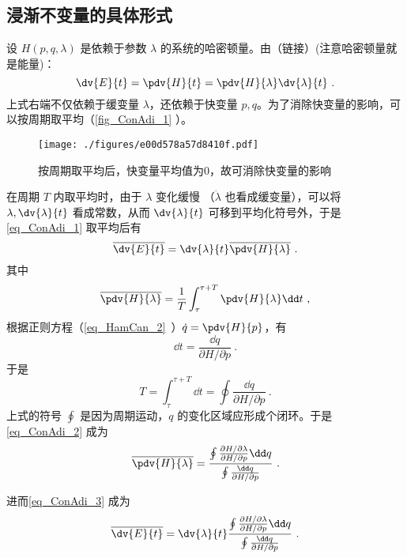 \subsection{浸渐不变量的具体形式}
设 $H(p,q,\lambda)$ 是依赖于参数 $\lambda$ 的系统的哈密顿量。由（链接）(注意哈密顿量就是能量)：
\begin{equation}\label{eq_ConAdi_1}
\dv{E}{t}=\pdv{H}{t}=\pdv{H}{\lambda}\dv{\lambda}{t}~.
\end{equation}
上式右端不仅依赖于缓变量 $\lambda$，还依赖于快变量 $p,q$。为了消除快变量的影响，可以按周期取平均（\autoref{fig_ConAdi_1} ）。
\begin{figure}[ht]
\centering
\texttt{[image: ./figures/e00d578a57d8410f.pdf]}
\caption{按周期取平均后，快变量平均值为0，故可消除快变量的影响} \label{fig_ConAdi_1}
\end{figure}
在周期 $T$ 内取平均时，由于 $\lambda$ 变化缓慢 （$\dot\lambda$ 也看成缓变量），可以将 $\lambda,\dv{\lambda}{t}$ 看成常数，从而 $\dv{\lambda}{t}$ 可移到平均化符号外，于是\autoref{eq_ConAdi_1} 取平均后有
\begin{equation}\label{eq_ConAdi_3}
\overline{\dv{E}{t}}=\dv{\lambda}{t}\overline{\pdv{H}{\lambda}}~.
\end{equation}
其中
\begin{equation}\label{eq_ConAdi_2}
\overline{\pdv{H}{\lambda}}=\frac{1}{T}\int_\tau^{\tau+T}\pdv{H}{\lambda}\dd t~,
\end{equation}
根据正则方程（\autoref{eq_HamCan_2}~）$\dot q=\pdv{H}{p}$，有
\begin{equation}
\dd t=\frac{\dd q}{\partial{H}/\partial{p}}~.
\end{equation}
于是
\begin{equation}
T=\int_{\tau}^{\tau+T}\dd t=\oint\frac{\dd q}{\partial{H}/\partial{p}}~.
\end{equation}
上式的符号 $\oint$ 是因为周期运动，$q$ 的变化区域应形成个闭环。于是\autoref{eq_ConAdi_2} 成为
\begin{equation}
\overline{\pdv{H}{\lambda}}=\frac{\oint\frac{\partial{H}/\partial{\lambda}}{\partial{H}/\partial{p}}\dd q}
{\oint\frac{\dd q}{\partial{H}/\partial{p}}}~.
\end{equation}
 
进而\autoref{eq_ConAdi_3} 成为
\begin{equation}\label{eq_ConAdi_5}
\overline{\dv{E}{t}}=\dv{\lambda}{t}
\frac{\oint\frac{\partial{H}/\partial{\lambda}}{\partial{H}/\partial{p}}\dd q}
{\oint\frac{\dd q}{\partial{H}/\partial{p}}}~.
\end{equation}

